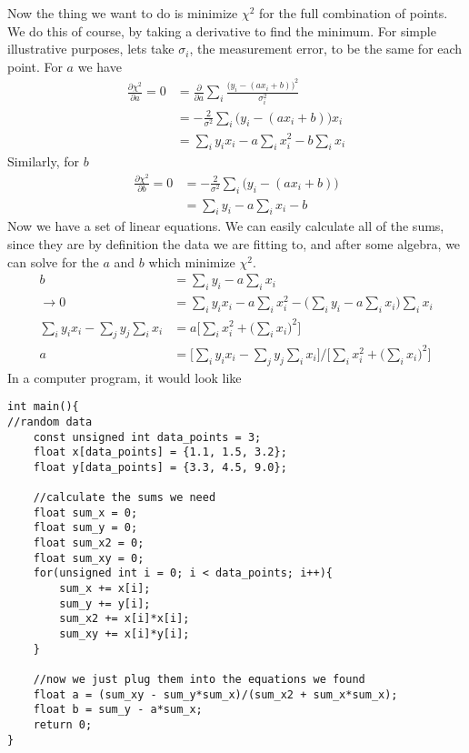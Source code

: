 Now the thing we want to do is minimize $\chi^2$ for the full combination of points. We do this of course, by taking a derivative to find the minimum. For simple illustrative purposes, lets take $\sigma_i$, the measurement error, to be the same for each point. For $a$ we have
\begin{align}
\frac{\partial \chi^2}{\partial a} = 0 &= \frac{\partial}{\partial a} \sum_i \frac{\Big(y_i - (ax_i + b)\Big)^2}{\sigma_i^2} \\
&= - \frac{2}{\sigma^2}\sum_i \Big(y_i - (ax_i+b)\Big)x_i\\
&= \sum_i y_i x_i - a\sum_ix_i^2 - b\sum_i x_i
\end{align}
Similarly, for $b$
\begin{align}
\frac{\partial \chi^2}{\partial b} = 0 &= -\frac{2}{\sigma^2}\sum_i \Big(y_i-(ax_i+b)\Big)\\
&= \sum_i y_i - a \sum_i x_i - b
\end{align}
Now we have a set of linear equations. We can easily calculate all of the sums, since they are by definition the data we are fitting to, and after some algebra, we can solve for the $a$ and $b$ which minimize $\chi^2$.
\begin{align}
b &= \sum_i y_i - a \sum_i x_i\\
\rightarrow 0 &= \sum_i y_i x_i - a\sum_ix_i^2 - \Big(\sum_i y_i - a \sum_i x_i\Big)\sum_i x_i\\
\sum_i y_i x_i  - \sum_j y_j \sum_i x_i &= a\Big[\sum_i x_i^2 +\Big(\sum_i x_i\Big)^2\Big]\\
a &= \Big[\sum_i y_i x_i  - \sum_j y_j \sum_i x_i\Big] /\Big[\sum_i x_i^2 +\Big(\sum_i x_i\Big)^2\Big] 
\end{align}
In a computer program, it would look like
\begin{verbatim}
int main(){
//random data
    const unsigned int data_points = 3;
    float x[data_points] = {1.1, 1.5, 3.2};
    float y[data_points] = {3.3, 4.5, 9.0};
    
    //calculate the sums we need
    float sum_x = 0;
    float sum_y = 0;
    float sum_x2 = 0;
    float sum_xy = 0;
    for(unsigned int i = 0; i < data_points; i++){
        sum_x += x[i];
        sum_y += y[i];
        sum_x2 += x[i]*x[i];
        sum_xy += x[i]*y[i];
    }
    
    //now we just plug them into the equations we found
    float a = (sum_xy - sum_y*sum_x)/(sum_x2 + sum_x*sum_x);
    float b = sum_y - a*sum_x;
    return 0;
}
\end{verbatim}

